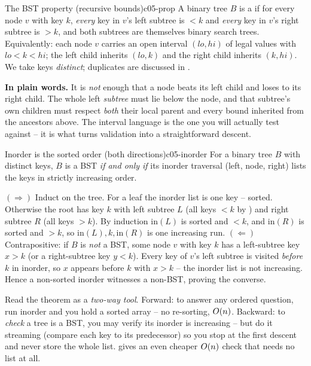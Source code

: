 \begin{definition}{The BST property (recursive bounds)}{c05-prop}
A binary tree $B$ is a  if for every node $v$ with key $k$,
\emph{every} key in $v$'s left subtree is $< k$ and \emph{every} key in $v$'s right subtree is $> k$,
and both subtrees are themselves binary search trees. Equivalently: each node $v$ carries an open
interval $(\mathit{lo},\mathit{hi})$ of legal values with $\mathit{lo}<k<\mathit{hi}$; the left child
inherits $(\mathit{lo},k)$ and the right child inherits $(k,\mathit{hi})$. We take keys
\emph{distinct}; duplicates are discussed in .
\end{definition}

\noindent\textbf{In plain words.} It is \emph{not} enough that a node beats its left child and loses
to its right child. The whole left \emph{subtree} must lie below the node, and that subtree's own
children must respect \emph{both} their local parent and every bound inherited from the ancestors
above. The interval language is the one you will actually test against -- it is what turns
validation into a straightforward descent.

\begin{theorem}{Inorder is the sorted order (both directions)}{c05-inorder}
For a binary tree $B$ with distinct keys, $B$ is a BST \emph{if and only if} its inorder traversal
(left, node, right) lists the keys in strictly increasing order.
\end{theorem}
\begin{proofbox}
$(\Rightarrow)$ Induct on the tree. For a leaf the inorder list is one key -- sorted. Otherwise the
root has key $k$ with left subtree $L$ (all keys $<k$ by ) and right subtree $R$
(all keys $>k$). By induction $\mathrm{in}(L)$ is sorted and $<k$, and $\mathrm{in}(R)$ is sorted and
$>k$, so $\mathrm{in}(L),k,\mathrm{in}(R)$ is one increasing run. $(\Leftarrow)$ Contrapositive: if
$B$ is \emph{not} a BST, some node $v$ with key $k$ has a left-subtree key $x>k$ (or a right-subtree
key $y<k$). Every key of $v$'s left subtree is visited \emph{before} $k$ in inorder, so $x$ appears
before $k$ with $x>k$ -- the inorder list is not increasing. Hence a non-sorted inorder witnesses a
non-BST, proving the converse. \end{proofbox}
\begin{insightbox}
Read the theorem as a \emph{two-way tool}. Forward: to answer any ordered question, run inorder and
you hold a sorted array -- no re-sorting, $O(n)$. Backward: to \emph{check} a tree is a BST, you
may verify its inorder is increasing -- but do it streaming (compare each key to its predecessor)
so you stop at the first descent and never store the whole list.  gives an even
cheaper $O(n)$ check that needs no list at all.
\end{insightbox}

